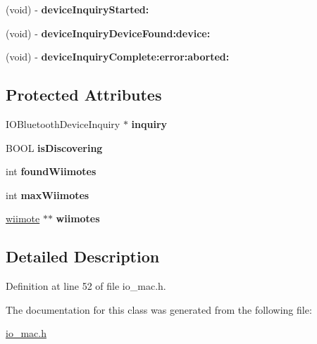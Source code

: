 \begin{DoxyCompactItemize}
\item 
\hypertarget{interface_wii_search_ade01f115383cdd698af8927f28f63b1d}{(void) -\/ {\bfseries device\-Inquiry\-Started\-:}}\label{interface_wii_search_ade01f115383cdd698af8927f28f63b1d}

\item 
\hypertarget{interface_wii_search_a0657d3778a59f06a7e88f384bcbdef15}{(void) -\/ {\bfseries device\-Inquiry\-Device\-Found\-:device\-:}}\label{interface_wii_search_a0657d3778a59f06a7e88f384bcbdef15}

\item 
\hypertarget{interface_wii_search_ad98054ad882cc29eb6f216cd0bcddb0b}{(void) -\/ {\bfseries device\-Inquiry\-Complete\-:error\-:aborted\-:}}\label{interface_wii_search_ad98054ad882cc29eb6f216cd0bcddb0b}

\end{DoxyCompactItemize}
\subsection*{\-Protected \-Attributes}
\begin{DoxyCompactItemize}
\item 
\hypertarget{interface_wii_search_a90d49084a8c785eed6002794e884a58a}{\-I\-O\-Bluetooth\-Device\-Inquiry $\ast$ {\bfseries inquiry}}\label{interface_wii_search_a90d49084a8c785eed6002794e884a58a}

\item 
\hypertarget{interface_wii_search_a975efbb9edea1f450ea2219ea39da6f8}{\-B\-O\-O\-L {\bfseries is\-Discovering}}\label{interface_wii_search_a975efbb9edea1f450ea2219ea39da6f8}

\item 
\hypertarget{interface_wii_search_a5c1c217bc608641c4f8ff1d4818774eb}{int {\bfseries found\-Wiimotes}}\label{interface_wii_search_a5c1c217bc608641c4f8ff1d4818774eb}

\item 
\hypertarget{interface_wii_search_ab13e41ad50369c11d865f2f5ce2bd007}{int {\bfseries max\-Wiimotes}}\label{interface_wii_search_ab13e41ad50369c11d865f2f5ce2bd007}

\item 
\hypertarget{interface_wii_search_aeb962f3f862b4bbf85e62cd4d68fd2cd}{\hyperlink{structwiimote__t}{wiimote} $\ast$$\ast$ {\bfseries wiimotes}}\label{interface_wii_search_aeb962f3f862b4bbf85e62cd4d68fd2cd}

\end{DoxyCompactItemize}


\subsection{\-Detailed \-Description}


\-Definition at line 52 of file io\-\_\-mac.\-h.



\-The documentation for this class was generated from the following file\-:\begin{DoxyCompactItemize}
\item 
\hyperlink{io__mac_8h}{io\-\_\-mac.\-h}\end{DoxyCompactItemize}
